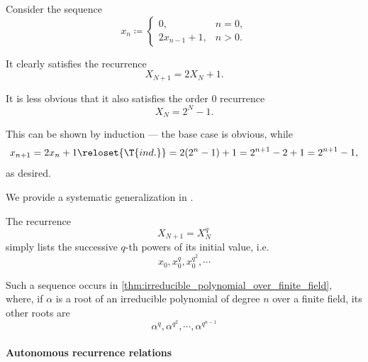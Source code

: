 \begin{example}
\begin{thmenum}
     Consider the sequence
    \begin{equation*}
      x_n \coloneqq \begin{cases}
        0,            &n = 0, \\
        2x_{n-1} + 1, &n > 0.
      \end{cases}
    \end{equation*}

    It clearly satisfies the recurrence
    \begin{equation*}
      X_{N+1} = 2X_N + 1.
    \end{equation*}

    It is less obvious that it also satisfies the order \( 0 \) recurrence
    \begin{equation*}
      X_N = 2^N - 1.
    \end{equation*}

    This can be shown by induction --- the base case is obvious, while
    \begin{equation*}
      x_{n+1}
      =
      2x_n + 1
      \reloset {\T{ind.}} =
      2(2^n - 1) + 1
      =
      2^{n+1} - 2 + 1
      =
      2^{n+1} - 1,
    \end{equation*}
    as desired.

    We provide a systematic generalization in .

     The recurrence
    \begin{equation*}
      X_{N+1} = X_N^q
    \end{equation*}
    simply lists the successive \( q \)-th powers of its initial value, i.e.
    \begin{equation*}
      x_0, x_0^q, x_0^{q^2}, \cdots
    \end{equation*}

    Such a sequence occurs in \cref{thm:irreducible_polynomial_over_finite_field}, where, if \( \alpha \) is a root of an irreducible polynomial of degree \( n \) over a finite field, its other roots are
    \begin{equation*}
      \alpha^q, \alpha^{q^2}, \cdots, \alpha^{q^{n-1}}
    \end{equation*}
  \end{thmenum}
\end{example}

\paragraph{Autonomous recurrence relations}

